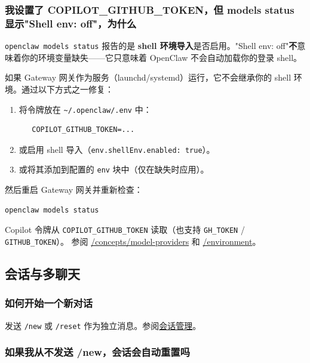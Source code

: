 \subsubsection{我设置了 COPILOT\_GITHUB\_TOKEN，但 models status 显示"Shell env: off"，为什么}


\texttt{openclaw models status} 报告的是 \textbf{shell 环境导入}是否启用。"Shell env: off"\textbf{不}意味着你的环境变量缺失——它只意味着 OpenClaw 不会自动加载你的登录 shell。

如果 Gateway 网关作为服务（launchd/systemd）运行，它不会继承你的 shell 环境。通过以下方式之一修复：

\begin{enumerate}
  \item 将令牌放在 \texttt{\textasciitilde{}/.openclaw/.env} 中：
\begin{lstlisting}
   COPILOT_GITHUB_TOKEN=...
\end{lstlisting}

  \item 或启用 shell 导入（\texttt{env.shellEnv.enabled: true}）。
  \item 或将其添加到配置的 \texttt{env} 块中（仅在缺失时应用）。
\end{enumerate}


然后重启 Gateway 网关并重新检查：

\begin{lstlisting}[language=bash]
openclaw models status
\end{lstlisting}


Copilot 令牌从 \texttt{COPILOT\_GITHUB\_TOKEN} 读取（也支持 \texttt{GH\_TOKEN} / \texttt{GITHUB\_TOKEN}）。
参阅 \href{/concepts/model-providers}{/concepts/model-providers} 和 \href{/help/environment}{/environment}。

\subsection{会话与多聊天}


\subsubsection{如何开始一个新对话}


发送 \texttt{/new} 或 \texttt{/reset} 作为独立消息。参阅\href{/concepts/session}{会话管理}。

\subsubsection{如果我从不发送 /new，会话会自动重置吗}


